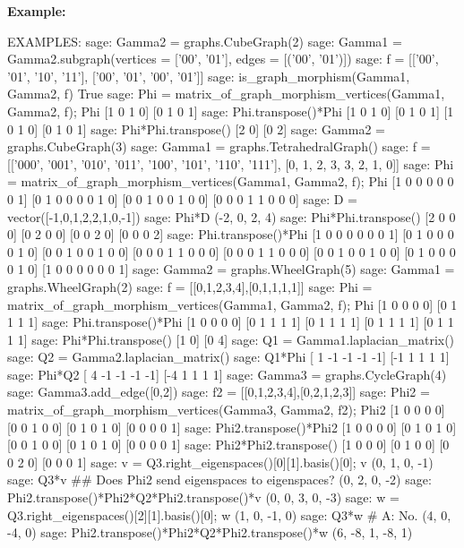 \documentclass{article}
\begin{document}
\textbf{Example:}
\begin{spverbatim}
    EXAMPLES:
        sage: Gamma2 = graphs.CubeGraph(2)
        sage: Gamma1 = Gamma2.subgraph(vertices = ['00', '01'], edges = [('00', '01')])
        sage: f = [['00', '01', '10', '11'], ['00', '01', '00', '01']]
        sage: is_graph_morphism(Gamma1, Gamma2, f)
        True
        sage: Phi = matrix_of_graph_morphism_vertices(Gamma1, Gamma2, f); Phi
        [1 0 1 0]
        [0 1 0 1]
        sage: Phi.transpose()*Phi
        [1 0 1 0]
        [0 1 0 1]
        [1 0 1 0]
        [0 1 0 1]
        sage: Phi*Phi.transpose()
        [2 0]
        [0 2]
        sage: Gamma2 = graphs.CubeGraph(3)
        sage: Gamma1 = graphs.TetrahedralGraph()
        sage: f = [['000', '001', '010', '011', '100', '101', '110', '111'], [0, 1, 2, 3, 3, 2, 1, 0]]
        sage: Phi = matrix_of_graph_morphism_vertices(Gamma1, Gamma2, f); Phi
        [1 0 0 0 0 0 0 1]
        [0 1 0 0 0 0 1 0]
        [0 0 1 0 0 1 0 0]
        [0 0 0 1 1 0 0 0]
        sage: D = vector([-1,0,1,2,2,1,0,-1])
        sage: Phi*D
        (-2, 0, 2, 4)
        sage: Phi*Phi.transpose()
        [2 0 0 0]
        [0 2 0 0]
        [0 0 2 0]
        [0 0 0 2]
        sage: Phi.transpose()*Phi
        [1 0 0 0 0 0 0 1]
        [0 1 0 0 0 0 1 0]
        [0 0 1 0 0 1 0 0]
        [0 0 0 1 1 0 0 0]
        [0 0 0 1 1 0 0 0]
        [0 0 1 0 0 1 0 0]
        [0 1 0 0 0 0 1 0]
        [1 0 0 0 0 0 0 1]
        sage: Gamma2 = graphs.WheelGraph(5)
        sage: Gamma1 = graphs.WheelGraph(2)
        sage: f = [[0,1,2,3,4],[0,1,1,1,1]]
        sage: Phi = matrix_of_graph_morphism_vertices(Gamma1, Gamma2, f); Phi
        [1 0 0 0 0]
        [0 1 1 1 1]
        sage: Phi.transpose()*Phi
        [1 0 0 0 0]
        [0 1 1 1 1]
        [0 1 1 1 1]
        [0 1 1 1 1]
        [0 1 1 1 1]
        sage: Phi*Phi.transpose()
        [1 0]
        [0 4]
        sage: Q1 = Gamma1.laplacian_matrix()
        sage: Q2 = Gamma2.laplacian_matrix()
        sage: Q1*Phi
        [ 1 -1 -1 -1 -1]
        [-1  1  1  1  1]
        sage: Phi*Q2
        [ 4 -1 -1 -1 -1]
        [-4  1  1  1  1]
        sage: Gamma3 = graphs.CycleGraph(4)
        sage: Gamma3.add_edge([0,2])
        sage: f2 = [[0,1,2,3,4],[0,2,1,2,3]]
        sage: Phi2 = matrix_of_graph_morphism_vertices(Gamma3, Gamma2, f2); Phi2
        [1 0 0 0 0]
        [0 0 1 0 0]
        [0 1 0 1 0]
        [0 0 0 0 1]
        sage: Phi2.transpose()*Phi2
        [1 0 0 0 0]
        [0 1 0 1 0]
        [0 0 1 0 0]
        [0 1 0 1 0]
        [0 0 0 0 1]
        sage: Phi2*Phi2.transpose()
        [1 0 0 0]
        [0 1 0 0]
        [0 0 2 0]
        [0 0 0 1]
        sage: v = Q3.right_eigenspaces()[0][1].basis()[0]; v
        (0, 1, 0, -1)
        sage: Q3*v ## Does Phi2 send eigenspaces to eigenspaces?
        (0, 2, 0, -2)
        sage: Phi2.transpose()*Phi2*Q2*Phi2.transpose()*v
        (0, 0, 3, 0, -3)
        sage: w = Q3.right_eigenspaces()[2][1].basis()[0]; w
        (1, 0, -1, 0)
        sage: Q3*w # A: No.
        (4, 0, -4, 0)
        sage: Phi2.transpose()*Phi2*Q2*Phi2.transpose()*w
        (6, -8, 1, -8, 1)
\end{spverbatim}
\end{document}
